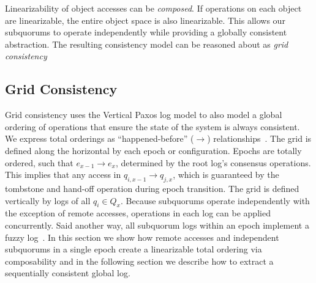 Linearizability of object accesses can be \emph{composed}.
If operations on each object are linearizable, the entire object space is also linearizable.
This allows our subquorums to operate independently while providing a globally consistent abstraction.
The resulting consistency model can be reasoned about as \emph{grid consistency}

\subsection{Grid Consistency}
\label{ch03_grid_consistency}

Grid consistency uses the Vertical Paxos log model to also model a global ordering of operations that ensure the state of the system is always consistent.
We express total orderings as ``happened-before'' ($\rightarrow$) relationships~\cite{lamport_time_1978}.
The grid is defined along the horizontal by each epoch or configuration.
Epochs are totally ordered, such that $e_{x-1} \rightarrow e_{x}$, determined by the root log's consensus operations.
This implies that any access in $q_{i,x-1} \rightarrow q_{j,x}$, which is guaranteed by the tombstone and hand-off operation during epoch transition.
The grid is defined vertically by logs of all $q_i \in Q_x$.
Because subquorums operate independently with the exception of remote accesses, operations in each log can be applied concurrently.
Said another way, all subquorum logs within an epoch implement a fuzzy log~\cite{fuzzy_log}.
In this section we show how remote accesses and independent subquorums in a single epoch create a linearizable total ordering via composability and in the following section we describe how to extract a sequentially consistent global log.

